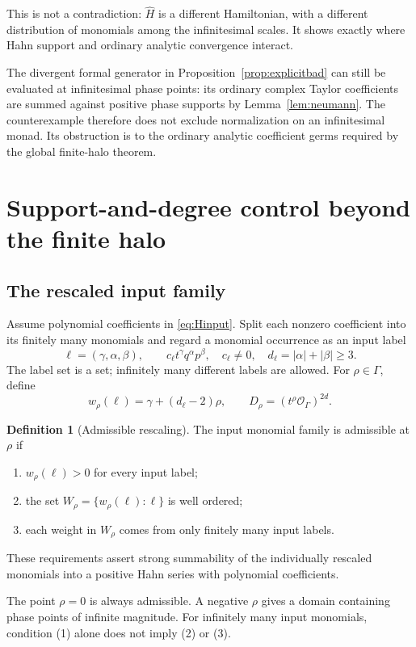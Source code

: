 \documentclass[11pt,letterpaper]{article}
\numberwithin{equation}{section}
\theoremstyle{definition}
\newtheorem{definition}[theorem]{Definition}
\theoremstyle{remark}
\newcommand{\OO}{\mathcal O}
\begin{document}
This is not a contradiction: $\widehat H$ is a different Hamiltonian, with
a different distribution of monomials among the infinitesimal scales. It
shows exactly where Hahn support and ordinary analytic convergence interact.

The divergent formal generator in Proposition~\ref{prop:explicitbad}
can still be evaluated at infinitesimal phase points: its ordinary complex
Taylor coefficients are summed against positive phase supports by
Lemma~\ref{lem:neumann}. The counterexample therefore does not exclude
normalization on an infinitesimal monad. Its obstruction is to the ordinary
analytic coefficient germs required by the global finite-halo theorem.


\section{Support-and-degree control beyond the finite halo}
\label{sec:domains}

\subsection{The rescaled input family}
Assume polynomial coefficients in \eqref{eq:Hinput}. Split each nonzero
coefficient into its finitely many monomials and regard a monomial occurrence
as an input label
\[
 \ell=(\gamma,\alpha,\beta),\qquad
 c_\ell t^\gamma q^\alpha p^\beta,
 \quad c_\ell\ne0,\quad d_\ell=|\alpha|+|\beta|\ge3.
\]
The label set is a set; infinitely many different labels are allowed. For
$\rho\in\Gamma$, define
\begin{equation}\label{eq:weights}
 w_\rho(\ell)=\gamma+(d_\ell-2)\rho,
 \qquad D_\rho=(t^\rho\OO_\Gamma)^{2d}.
\end{equation}

\begin{definition}[Admissible rescaling]\label{def:admissible}
The input monomial family is admissible at $\rho$ if
\begin{enumerate}[label=(\arabic*)]
\item $w_\rho(\ell)>0$ for every input label;
\item the set $W_\rho=\{w_\rho(\ell):\ell\}$ is well ordered;
\item each weight in $W_\rho$ comes from only finitely many input labels.
\end{enumerate}
These requirements assert strong summability of the individually rescaled
monomials into a positive Hahn series with polynomial coefficients.
\end{definition}
The point $\rho=0$ is always admissible. A negative $\rho$ gives a domain
containing phase points of infinite magnitude. For infinitely many input
monomials, condition (1) alone does not imply (2) or (3).
\end{document}
